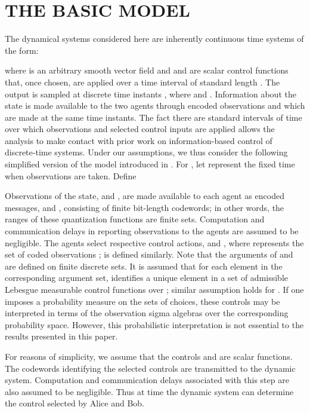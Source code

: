 \documentclass[12pt,onecolumn,draftcls]{IEEEtran}
\begin{document}
\section{THE BASIC MODEL}\setcounter{equation}{0}

The dynamical systems considered here are inherently continuous time systems of the form:


where  is an arbitrary smooth vector field and   and  are scalar control functions that, once chosen, are applied over a time interval of standard length .   The output  is sampled at discrete time instants , where  and .  Information about the state is made available to the two agents through encoded observations  and  which are made at the same time instants.
The fact there are standard intervals of time over which observations and selected control inputs are applied allows the analysis  to make contact with prior work on information-based control of discrete-time systems.  Under our assumptions, we thus consider
the following simplified version of the model introduced in \cite{Wong}.
For , let  represent the fixed time when observations are taken. Define

Observations of the state,   and , are made available to each agent
as encoded messages,  and , consisting of finite bit-length codewords; in other words, the ranges of these quantization functions are finite sets.  
Computation and communication delays in reporting observations to the agents are assumed to be negligible.
The agents select respective control actions,
 and ,
where  represents the set of coded observations
;  is defined similarly.  Note that the arguments of  and  are defined on finite
discrete sets.  It is assumed that for each element in the corresponding argument set,  identifies a unique element in a set of admissible Lebesgue measurable control functions over ; similar assumption holds for .
If one imposes a probability measure on the sets of choices, these controls may be interpreted in terms of the observation sigma algebras over the corresponding probability space.  However, this probabilistic interpretation is not essential to the results presented in this paper.
 
For reasons of simplicity, we assume that the controls  and  are scalar functions.  The codewords identifying the selected controls are transmitted to the dynamic system.
Computation and communication delays associated with this step are also assumed to be negligible.
Thus at time  the dynamic system can determine the control selected by Alice and Bob.
\end{document}
